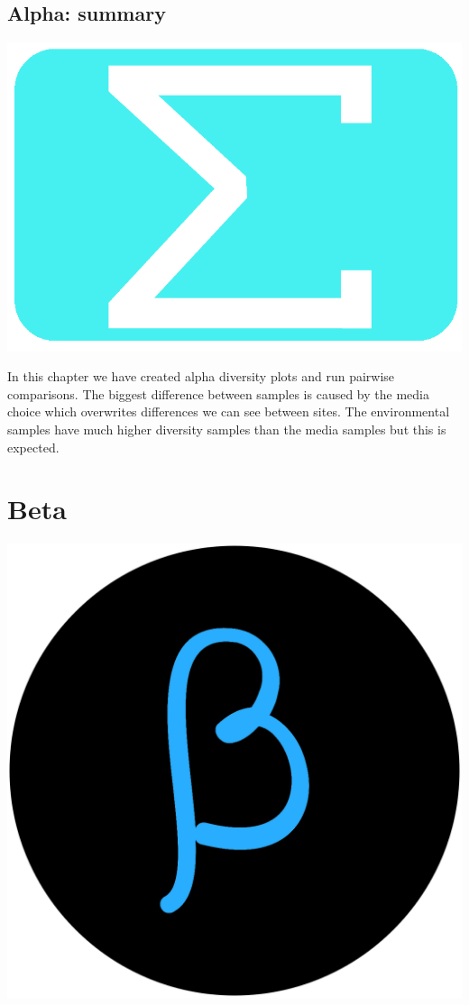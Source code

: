 \documentclass[
]{book}
\begin{document}
\hypertarget{alpha-summary}{%
\section{Alpha: summary}\label{alpha-summary}}

\includegraphics{figures/sum_blue.png}

In this chapter we have created alpha diversity plots and run pairwise comparisons.
The biggest difference between samples is caused by the media choice which overwrites differences we can see between sites.
The environmental samples have much higher diversity samples than the media samples but this is expected.

\hypertarget{beta_chap}{%
\chapter{Beta}\label{beta_chap}}

\includegraphics{figures/beta.png}
\end{document}
